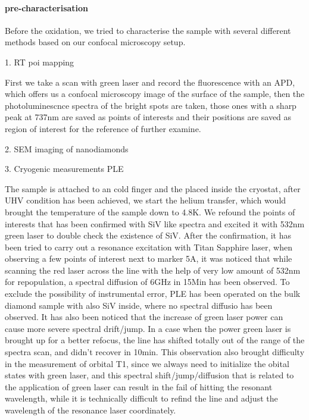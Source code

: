 \paragraph{pre-characterisation}
Before the oxidation, we tried to characterise the sample with several different methods based on our confocal microscopy setup.

1. RT poi mapping

First we take a scan with green laser and record the fluorescence with an APD, which offers us a confocal microscopy image of the surface of the sample, then the photoluminescnce spectra of the bright spots are taken, those ones with a sharp peak at 737nm are saved as points of interests and their positions are saved as region of interest for the reference of further examine.


2. SEM imaging of nanodiamonds



3. Cryogenic measurements PLE
 
The sample is attached to an cold finger and the placed inside the cryostat, after UHV condition has been achieved, we start the helium transfer, which would brought the temperature of the sample down to 4.8K. We refound the points of interests that has been confirmed with SiV like spectra and excited it with 532nm green laser to double check the existence of SiV. After the confirmation, it has been tried to carry out a resonance excitation with Titan Sapphire laser, when observing a few points of interest next to marker 5A, it was noticed that while scanning the red laser across the line with the help of very low amount of 532nm for repopulation, a spectral diffusion of 6GHz in 15Min has been observed. To exclude the possibility of instrumental error, PLE has been operated on the bulk diamond sample with also SiV inside, where no spectral diffusio has been observed. It has also been noticed that the increase of green laser power can cause more severe spectral drift/jump. In a case when the power green laser is brought up for a better refocus, the line has shifted totally out of the range of the spectra scan, and didn't recover in 10min. This observation also brought difficulty in the measurement of orbital T1, since we always need to initialize the obital states with green laser, and this spectral shift/jump/diffusion that is related to the application of green laser can result in the fail of hitting the resonant wavelength, while it is technically difficult to refind the line and adjust the wavelength of the resonance laser coordinately. 

